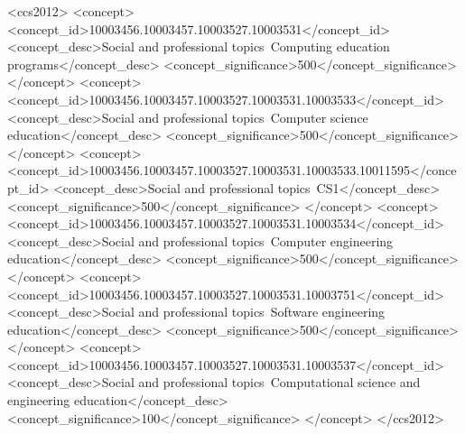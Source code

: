 \documentclass[english,submission]{programming}
\begin{document}
 \begin{CCSXML}
<ccs2012>
<concept>
<concept_id>10003456.10003457.10003527.10003531</concept_id>
<concept_desc>Social and professional topics~Computing education programs</concept_desc>
<concept_significance>500</concept_significance>
</concept>
<concept>
<concept_id>10003456.10003457.10003527.10003531.10003533</concept_id>
<concept_desc>Social and professional topics~Computer science education</concept_desc>
<concept_significance>500</concept_significance>
</concept>
<concept>
<concept_id>10003456.10003457.10003527.10003531.10003533.10011595</concept_id>
<concept_desc>Social and professional topics~CS1</concept_desc>
<concept_significance>500</concept_significance>
</concept>
<concept>
<concept_id>10003456.10003457.10003527.10003531.10003534</concept_id>
<concept_desc>Social and professional topics~Computer engineering education</concept_desc>
<concept_significance>500</concept_significance>
</concept>
<concept>
<concept_id>10003456.10003457.10003527.10003531.10003751</concept_id>
<concept_desc>Social and professional topics~Software engineering education</concept_desc>
<concept_significance>500</concept_significance>
</concept>
<concept>
<concept_id>10003456.10003457.10003527.10003531.10003537</concept_id>
<concept_desc>Social and professional topics~Computational science and engineering education</concept_desc>
<concept_significance>100</concept_significance>
</concept>
</ccs2012>
\end{CCSXML}




\maketitle
\end{document}
